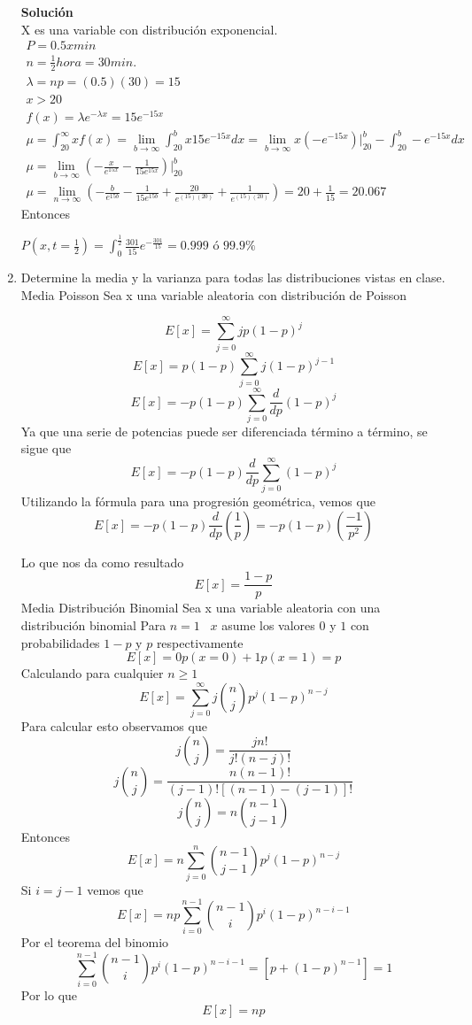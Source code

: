 \begin{enumerate}
    \textbf{Solución} \\
    X es una variable con distribución exponencial. \\
    \begin{gather*}
    P = 0.5 x min  \\
    n = \frac{1}{2}hora = 30 min.  \\
    \lambda = np = (0.5)(30) = 15 \\
    x > 20  \\
     f(x) = \lambda e^{-\lambda x} = 15e^{-15x}\\
     \mu = \int_{20}^{\infty} xf(x) = \lim_{b \to \infty} \int_{20}^{b} x15e^{-15x}dx = \lim_{b \to \infty} x(-e^{-15x}) \rvert_{20}^{b} - \int_{20}^{b} -e^{-15x}dx  \\
     \mu = \lim_{b \to \infty} \left( - \frac{x}{e^{15x}} - \frac{1}{15e^{15x}}  \right)  \rvert_{20}^{b}\\
     \mu = \lim_{n \to \infty} \left(  -\frac{b}{e^{15b}} - \frac{1}{15e^{15b}} + \frac{20}{e^{(15)(20)}} + \frac{1}{e^{(15)(20)}}  \right) = 20 + \frac{1}{15} = 20.067
    \end{gather*}
    Entonces 
    \begin{center}
        $ P(x,t = \frac{1}{2}) = \int_{0}^{\frac{1}{2}} \frac{301}{15}e^{-\frac{301}{15}} = 0.999 $ ó $99.9\% $
    \end{center}
    \item Determine la media y la varianza para todas las distribuciones vistas en clase.
    Media Poisson 
    Sea x una variable aleatoria con distribución de Poisson
    \begin{center}
        $$E[x] = \sum_{j = 0}^\infty jp(1 - p)^{j}$$
        $$E[x] = p(1 - p)\sum_{j = 0}^\infty j(1 - p)^{j - 1}$$
        $$E[x] = -p(1 - p)\sum_{j = 0}^\infty \dfrac{d}{dp}(1 - p)^{j}$$
        Ya que una serie de potencias puede ser diferenciada término a término, se sigue que
        $$E[x] = -p(1 - p)\dfrac{d}{dp}\sum_{j = 0}^\infty (1 - p)^{j}$$
        Utilizando la fórmula para una progresión geométrica, vemos que
        $$E[x] = -p(1 - p)\dfrac{d}{dp}\left(\dfrac{1}{p}\right) = -p(1 - p)\left(\dfrac{-1}{p^{2}}\right)$$
    \end{center}
        Lo que nos da como resultado
        $$E[x] = \dfrac{1 - p}{p}$$
        Media Distribución Binomial
        Sea x una variable aleatoria con una distribución binomial
        Para $n = 1 \;\;\; x$ asume los valores $0$ y $1$ con probabilidades $1 - p$ y $p$ respectivamente
        $$E[x] = 0p(x = 0) + 1p(x = 1) = p$$
        Calculando para cualquier $n \geq 1$ 
        $$E[x] = \sum_{j = 0}^\infty j\binom{n}{j}p^{j}(1 - p)^{n - j}$$
        Para calcular esto observamos que
        $$j\binom{n}{j} = \dfrac{jn!}{j!(n - j)!}$$
        $$j\binom{n}{j} = \dfrac{n(n - 1)!}{(j - 1)![(n - 1)- (j - 1)]!}$$
        $$j\binom{n}{j} = n\binom{n - 1}{j - 1}$$
        Entonces
        $$E[x] = n\sum_{j = 0}^n \binom{n - 1}{j - 1}p^{j}(1 - p)^{n - j}$$
        Si $i = j - 1$ vemos que
        $$E[x] = np\sum_{i = 0}^{n - 1} \binom{n - 1}{i}p^{i}(1 - p)^{n - i - 1}$$
        Por el teorema del binomio
        $$\sum_{i = 0}^{n - 1} \binom{n - 1}{i}p^{i}(1 - p)^{n - i - 1} = [p + (1 - p)^{n - 1}] = 1$$
        Por lo que 
        $$E[x] = np$$
\end{enumerate}